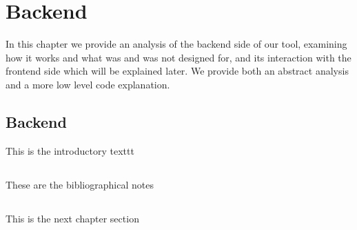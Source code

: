 %
%

\chapter{Backend}


\begin{resumen}
In this chapter we provide an analysis of the backend side of our tool, examining how it works and what was and was not designed for, and its interaction with the frontend side which will be explained later.
We provide both an abstract analysis and a more low level code explanation.
\end{resumen}


\section{Backend}
\label{cap1:sec:introduccion}

This is the introductory texttt

\section*{\NotasBibliograficas}
\TocNotasBibliograficas

These are the bibliographical notes
\citep{ldesc2e}

\medskip



\section*{\ProximoCapitulo}
\TocProximoCapitulo

This is the next chapter section

